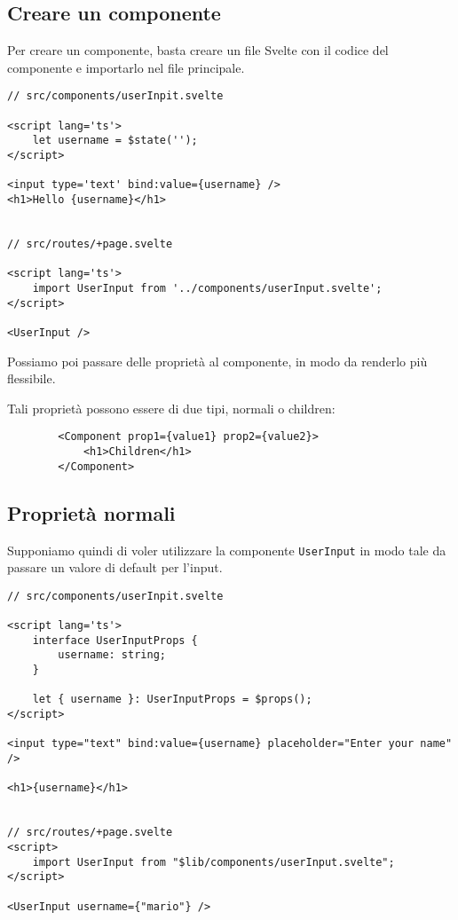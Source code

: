 \documentclass[12pt]{article}
\begin{document}
\subsection{Creare un componente}
Per creare un componente, basta creare un file Svelte con il codice del componente
e importarlo nel file principale.
\begin{verbatim}
// src/components/userInpit.svelte

<script lang='ts'>
    let username = $state('');
</script>

<input type='text' bind:value={username} />
<h1>Hello {username}</h1>


// src/routes/+page.svelte

<script lang='ts'>
    import UserInput from '../components/userInput.svelte';
</script>

<UserInput />
\end{verbatim}
Possiamo poi passare delle proprietà al componente, in modo da renderlo più flessibile.

Tali proprietà possono essere di due tipi, normali o children:
\begin{highlight}
    \begin{verbatim}
        <Component prop1={value1} prop2={value2}>
            <h1>Children</h1>
        </Component>
    \end{verbatim}
\end{highlight}

\subsection{Proprietà normali}
Supponiamo quindi di voler utilizzare la componente \texttt{UserInput}
in modo tale da passare un valore di default per l'input.

\begin{verbatim}
// src/components/userInpit.svelte

<script lang='ts'>
    interface UserInputProps {
        username: string;
    }

    let { username }: UserInputProps = $props();
</script>

<input type="text" bind:value={username} placeholder="Enter your name" />

<h1>{username}</h1>


// src/routes/+page.svelte
<script>
    import UserInput from "$lib/components/userInput.svelte";
</script>

<UserInput username={"mario"} />
\end{verbatim}
\end{document}
